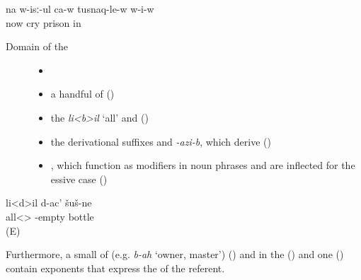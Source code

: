 \begin{exe}
	\ex	\label{ex:‎Now he is crying in prisonAGREE}
	\gll	na	w-isː-ul	ca-w	tusnaq-le-w	w-i-w\\
		now	cry		prison	in\\
	\glt	{}
\end{exe}


\begin{description}
\item[Domain of the ]
\begin{itemize}[leftmargin=*]
    \item[]
    \item	a handful of  ()
	\item	the  \textit{li<b>il} ‘all' and  ()
	\item	the derivational suffixes  and \textit{-azi-b}, which derive  ()
	\item	{}, which function as modifiers in noun phrases and are inflected for the essive case ()
\end{itemize}
\end{description}


\begin{exe}
	\ex	\label{ex:All empty bottlesAGREE}
	\gll	li<d>il d-ac' šuš-ne\\
		all<> 	-empty	bottle\\
	\glt	{} (E)
\end{exe}



Furthermore, a small  of  (e.g. \textit{b-ah} ‘owner, master') () and  in the  () and one  () contain  exponents that express the  of the referent.


